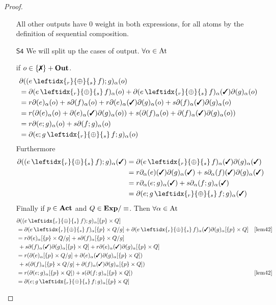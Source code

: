 \documentclass[a4paper,UKenglish,cleveref, autoref, thm-restate]{lipics-v2021}
\newcommand{\cmark}{\text{\ding{51}}}
\newcommand{\xmark}{\text{\ding{55}}}
\newcommand{\Out}{\textbf{\upshape{Out}}}
\newcommand{\Act}{\textbf{\upshape{Act}}}
\newcommand{\At}{\text{\upshape{At}}}
\newcommand{\Exp}{\textbf{\upshape{Exp}}}
\newcommand{\WC}[2]{\,\leftidx{_{#1}}{{\oplus}}{_{#2}}\,}
\newcommand{\Ax}[1]{\ensuremath{\mathsf{#1}}}
\theoremstyle{plain}\newtheoremrep{thm}{Theorem}[section]
\begin{document}
\begin{toappendix}
\begin{proof}
\begin{enumerate}
				All other outputs have $0$ weight in both expressions, for all atoms by the definition of sequential composition.
				\item[\Ax{S4}]
				We will split up the cases of output. $\forall \alpha \in \At$ 
				
				if $o \in \{\xmark\} + \Out$.
				\begin{align*}
					&\partial( (e \WC{r}{s} f);g)_\alpha(o)\\ 
					&=\partial( e \WC{r}{s} f)_\alpha(o) + \partial( e \WC{r}{s} f)_\alpha(\cmark)\partial(g)_\alpha(o)\\ 
					&= r\partial(e)_\alpha(o)+s\partial(f)_\alpha(o) + r\partial(e)_\alpha(\cmark)\partial(g)_\alpha(o)+s\partial(f)_\alpha(\cmark)\partial(g)_\alpha(o)\\
					&= r(\partial(e)_\alpha(o)+\partial(e)_\alpha(\cmark)\partial(g)_\alpha(o))+s(\partial(f)_\alpha(o)+\partial(f)_\alpha(\cmark)\partial(g)_\alpha(o))\\
					&= r\partial(e;g)_\alpha(o) + s\partial(f;g)_\alpha(o)\\
					&= \partial(e;g \WC{r}{s} f;g)_\alpha(o)  
				\end{align*}
				Furthermore
				\begin{align*}
					\partial( (e \WC{r}{s} f);g)_\alpha(\cmark) &= \partial( e \WC{r}{s} f)_\alpha(\cmark)\partial(g)_\alpha(\cmark)\\ 
					&= r\partial_\alpha(e)(\cmark)\partial(g)_\alpha(\cmark) +  s\partial_\alpha(f)(\cmark)\partial(g)_\alpha(\cmark)\\ 
					&= r\partial_\alpha( e;g)_\alpha(\cmark) +  s\partial_\alpha( f;g)_\alpha(\cmark)\\ 
					&= \partial(e;g \WC{r}{s} f;g)_\alpha(\cmark)  
				\end{align*}
				Finally if $p \in \Act$ and $Q\in \Exp/\equiv$. Then $\forall \alpha \in \At$ 
				\begin{align*}
					&\partial( (e \WC{r}{s} f);g)_\alpha[\{p\} \times Q] \\
					&= \partial( e \WC{r}{s} f)_\alpha[\{p\} \times Q/g] + \partial( e \WC{r}{s} f)_\alpha(\cmark)\partial(g)_\alpha[\{p\} \times Q] &  \cref{lem42}\\
					&=r\partial( e)_\alpha[\{p\} \times Q/g] + s\partial(f)_\alpha[\{p\} \times Q/g] \\&\;+ s\partial(f)_\alpha(\cmark)\partial(g)_\alpha[\{p\} \times Q] + r\partial(e)_\alpha(\cmark)\partial(g)_\alpha[\{p\} \times Q]\\ 
					&= r(\partial( e)_\alpha[\{p\} \times Q/g]+\partial(e)_\alpha(\cmark)\partial(g)_\alpha[\{p\} \times Q])\\&\;+ s(\partial(f)_\alpha[\{p\} \times Q/g] + \partial(f)_\alpha(\cmark)\partial(g)_\alpha[\{p\} \times Q])\\
					&= r(\partial(e;g)_\alpha[\{p\} \times Q]) +s(\partial(f;g)_\alpha[\{p\} \times Q])& \cref{lem42}\\
					&= \partial(e;g \WC{r}{s} f;g)_\alpha[\{p\} \times Q]		
				\end{align*}
				

\end{enumerate}
\end{proof}
\end{toappendix}
\end{document}

